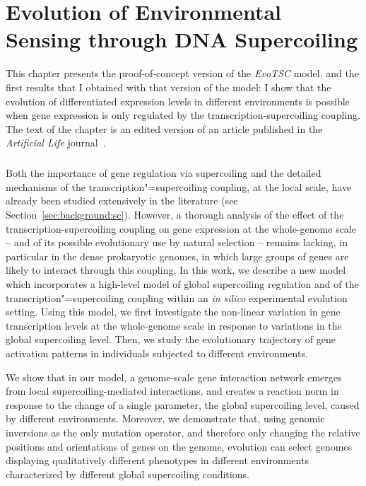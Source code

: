 \chapter{Evolution of Environmental Sensing through DNA Supercoiling}
\label{chap:alife}

This chapter presents the proof-of-concept version of the \emph{EvoTSC} model, and the first results that I obtained with that version of the model: I show that the evolution of differentiated expression levels in different environments is possible when gene expression is only regulated by the transcription-supercoiling coupling.
The text of the chapter is an edited version of an article published in the \emph{Artificial Life} journal~\citep{grohens2022a}.

\paragraph{}
Both the importance of gene regulation via supercoiling and the detailed mechanisms of the transcription"=supercoiling coupling, at the local scale, have already been studied extensively in the literature (see Section~\ref{sec:background:sc}).
However, a thorough analysis of the effect of the transcription-supercoiling coupling on gene expression at the whole-genome scale -- and of its possible evolutionary use by natural selection -- remains lacking, in particular in the dense prokaryotic genomes, in which large groups of genes are likely to interact through this coupling.
In this work, we describe a new model which incorporates a high-level model of global supercoiling regulation and of the transcription"=supercoiling coupling within an \emph{in silico} experimental evolution setting.
Using this model, we first investigate the non-linear variation in gene transcription levels at the whole-genome scale in response to variations in the global supercoiling level.
Then, we study the evolutionary trajectory of gene activation patterns in individuals subjected to different environments.

We show that in our model, a genome-scale gene interaction network emerges from local supercoiling-mediated interactions, and creates a reaction norm in response to the change of a single parameter, the global supercoiling level, caused by different environments.
Moreover, we demonstrate that, using genomic inversions as the only mutation operator, and therefore only changing the relative positions and orientations of genes on the genome, evolution can select genomes displaying qualitatively different phenotypes in different environments characterized by different global supercoiling conditions.

